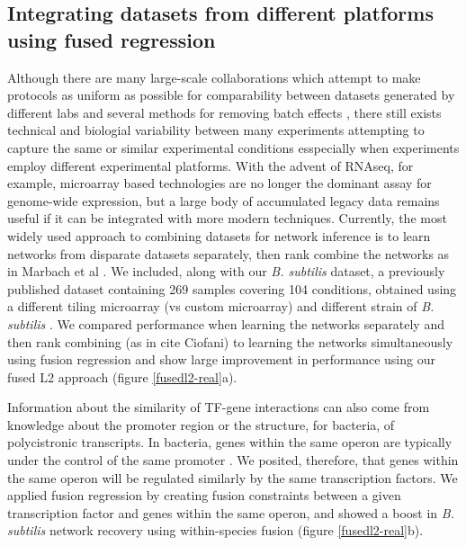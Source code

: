\documentclass[11pt]{article}
\begin{document}
\subsection{Integrating datasets from different platforms using fused regression}
Although there are many large-scale collaborations which attempt to make protocols as uniform as possible for comparability between datasets generated by different labs \cite{paten_nih_2015,kundaje_integrative_2015} and several methods for removing batch effects \cite{irizarry_exploration_2003,johnson_adjusting_2007}, there still exists technical and biologial variability between many experiments attempting to capture the same or similar experimental conditions esspecially when experiments employ different experimental platforms. 
With the advent of RNAseq, for example, microarray based technologies are no longer the dominant assay for genome-wide expression, but a large body of accumulated legacy data remains useful if it can be integrated with more modern techniques. 
Currently, the most widely used approach to combining datasets for network inference is to learn networks from disparate datasets separately, then rank combine the networks as in Marbach et al \cite{marbach_revealing_2010}.
We included, along with our \textit{B. subtilis} dataset, a previously published dataset containing 269 samples covering 104 conditions, obtained using a different tiling microarray (vs custom microarray) and different strain of \textit{B. subtilis} \cite{nicolas2012condition}. 
We compared performance when learning the networks separately and then rank combining (as in cite Ciofani) to learning the networks simultaneously using fusion regression and show large improvement in performance using our fused L2 approach (figure \ref{fusedl2-real}a). 

Information about the similarity of TF-gene interactions can also come from knowledge about the promoter region or the structure, for bacteria, of polycistronic transcripts. 
In bacteria, genes within the same operon are typically under the control of the same promoter \cite{lawrence_shared_2002}. 
We posited, therefore, that genes within the same operon will be regulated similarly by the same transcription factors. 
We applied fusion regression by creating fusion constraints between a given transcription factor and genes within the same operon, and showed a boost in \textit{B. subtilis} network recovery using within-species fusion (figure \ref{fusedl2-real}b). 
\end{document}
